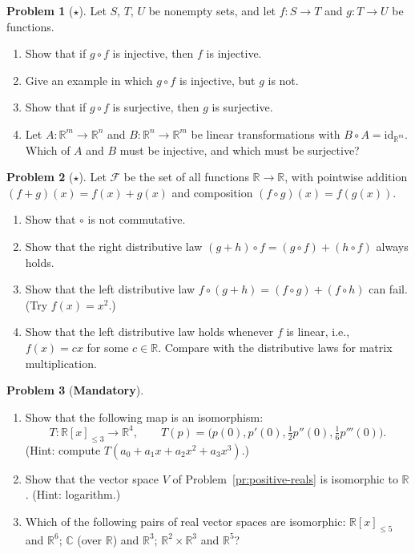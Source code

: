\documentclass[11pt]{article}
\theoremstyle{definition}
\newtheorem{problem}{Problem}[section]
\newcommand{\mandatory}{\textcolor{red!70!black}{\textbf{Mandatory}}}
\begin{document}
\begin{problem}[$\star$]\label{pr:composition}
    Let $S$, $T$, $U$ be nonempty sets, and let $f: S \to T$ and $g: T \to U$ be functions.
    \begin{enumerate}[label=(\alph*)]
        \item Show that if $g \circ f$ is injective, then $f$ is injective.
        \item Give an example in which $g \circ f$ is injective, but $g$ is not.
        \item Show that if $g \circ f$ is surjective, then $g$ is surjective.
        \item Let $A: \mathbb{R}^m \to \mathbb{R}^n$ and $B: \mathbb{R}^n \to \mathbb{R}^m$ be linear transformations with $B \circ A = \mathrm{id}_{\mathbb{R}^m}$. Which of $A$ and $B$ must be injective, and which must be surjective?
    \end{enumerate}
\end{problem}

\begin{problem}[$\star$]\label{pr:distributive}
    Let $\mathcal{F}$ be the set of all functions $\mathbb{R} \to \mathbb{R}$, with pointwise addition $(f + g)(x) = f(x) + g(x)$ and composition $(f \circ g)(x) = f(g(x))$.
    \begin{enumerate}[label=(\alph*)]
        \item Show that $\circ$ is not commutative.
        \item Show that the right distributive law $(g + h) \circ f = (g \circ f) + (h \circ f)$ always holds.
        \item Show that the left distributive law $f \circ (g + h) = (f \circ g) + (f \circ h)$ can fail. (Try $f(x) = x^2$.)
        \item Show that the left distributive law holds whenever $f$ is linear, i.e., $f(x) = cx$ for some $c \in \mathbb{R}$. Compare with the distributive laws for matrix multiplication.
    \end{enumerate}
\end{problem}

\begin{problem}[\mandatory]\label{pr:iso}
    \begin{enumerate}[label=(\alph*)]
        \item Show that the following map is an isomorphism:
        \[T: \mathbb{R}[x]_{\leq 3} \to \mathbb{R}^4, \qquad T(p) = \big(p(0), p'(0), \tfrac{1}{2}p''(0), \tfrac{1}{6}p'''(0)\big).\] (Hint: compute $T(a_0 + a_1 x + a_2 x^2 + a_3 x^3)$.)
        \item Show that the vector space $V$ of Problem~\ref{pr:positive-reals} is isomorphic to $\mathbb{R}$. (Hint: logarithm.)
        \item Which of the following pairs of real vector spaces are isomorphic: $\mathbb{R}[x]_{\leq 5}$ and $\mathbb{R}^6$; $\mathbb{C}$ (over $\mathbb{R}$) and $\mathbb{R}^3$; $\mathbb{R}^2 \times \mathbb{R}^3$ and $\mathbb{R}^5$?
    \end{enumerate}
\end{problem}
\end{document}
